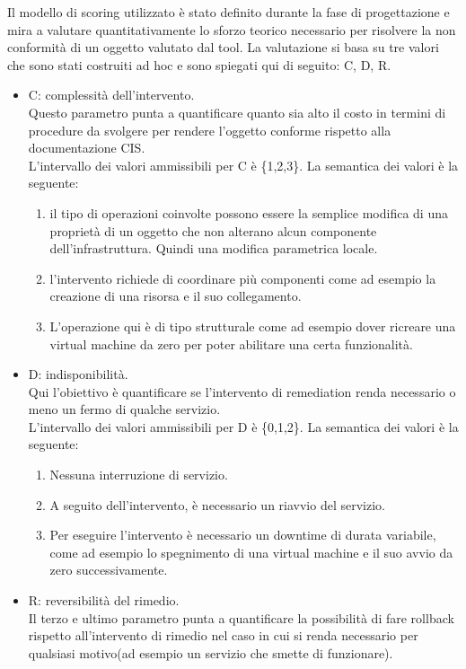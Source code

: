 \documentclass[a4paper,11pt]{report}
\begin{document}
Il modello di scoring utilizzato è stato definito durante la fase di progettazione e mira a valutare quantitativamente lo sforzo teorico necessario per risolvere la non conformità di un oggetto valutato dal tool. La valutazione si basa su tre valori che sono stati costruiti ad hoc e sono spiegati qui di seguito: C, D, R.\\

\begin{itemize}
\item C: complessità dell'intervento.\\
Questo parametro punta a quantificare quanto sia alto il costo in termini di procedure da svolgere per rendere l'oggetto conforme rispetto alla documentazione CIS. \\
L'intervallo dei valori ammissibili per C è \{1,2,3\}. La semantica dei valori è la seguente:
\begin{enumerate}
\item il tipo di operazioni coinvolte possono essere la semplice modifica di una proprietà di un oggetto che non alterano alcun componente dell'infrastruttura. Quindi una modifica parametrica locale.
\item l'intervento richiede di coordinare più componenti come ad esempio la creazione di una risorsa e il suo collegamento.
\item L'operazione qui è di tipo strutturale come ad esempio dover ricreare una virtual machine da zero per poter abilitare una certa funzionalità.
\end{enumerate}
\item D: indisponibilità. \\
Qui l'obiettivo è quantificare se l'intervento di remediation renda necessario o meno un fermo di qualche servizio.\\
L'intervallo dei valori ammissibili per D è \{0,1,2\}. La semantica dei valori è la seguente:
\begin{enumerate}[start=0]
\item Nessuna interruzione di servizio.
\item A seguito dell'intervento, è necessario un riavvio del servizio.
\item Per eseguire l'intervento è necessario un downtime di durata variabile, come ad esempio lo spegnimento di una virtual machine e il suo avvio da zero successivamente.
\end{enumerate}
\item R: reversibilità del rimedio. \\
Il terzo e ultimo parametro punta a quantificare la possibilità di fare rollback rispetto all'intervento di rimedio nel caso in cui si renda necessario per qualsiasi motivo(ad esempio un servizio che smette di funzionare). \\

\end{itemize}
\end{document}
